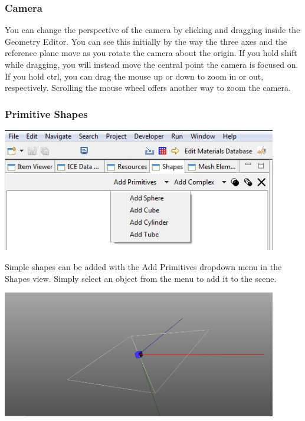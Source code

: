 \subsubsection{Camera}

You can change the perspective of the camera by clicking and dragging inside the
Geometry Editor. You can see this initially by the way the three axes and the
reference plane move as you rotate the camera about the origin. If you hold
shift while dragging, you will instead move the central point the camera is
focused on. If you hold ctrl, you can drag the mouse up or down to zoom in or
out, respectively. Scrolling the mouse wheel offers another way to zoom the camera.

\subsubsection{Primitive Shapes}

\begin{center}
\includegraphics[width=12cm]{images/GeometryAddPrimitive.jpg}
\end{center}

Simple shapes can be added with the Add Primitives dropdown menu in the Shapes
view. Simply select an object from the menu to add it to the scene.

\begin{center}
\includegraphics[width=12cm]{images/GeometryAddCube.jpg}
\end{center}

